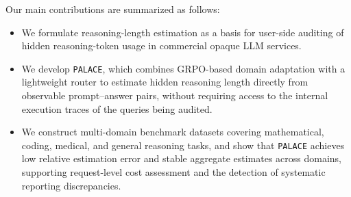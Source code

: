 \documentclass[pdflatex,sn-mathphys-num]{sn-jnl}%
\newcommand{\n}{\texttt{PALACE}\xspace}
\theoremstyle{thmstyleone}%
\theoremstyle{thmstyletwo}%
\theoremstyle{thmstylethree}%
\begin{document}
Our main contributions are summarized as follows:
\begin{itemize}
    \item We formulate reasoning-length estimation as a basis for user-side auditing of hidden reasoning-token usage in commercial opaque LLM services.

    \item We develop {\n}, which combines GRPO-based domain adaptation with a lightweight router to estimate hidden reasoning length directly from observable prompt--answer pairs, without requiring access to the internal execution traces of the queries being audited.

    \item We construct multi-domain benchmark datasets covering mathematical, coding, medical, and general reasoning tasks, and show that {\n} achieves low relative estimation error and stable aggregate estimates across domains, supporting request-level cost assessment and the detection of systematic reporting discrepancies.
\end{itemize}
\end{document}
